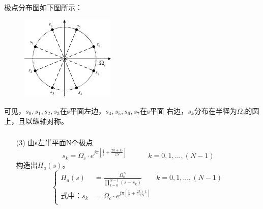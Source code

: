\documentclass[notheorems,compress,mathserif,table]{beamer}
\begin{document}
\begin{frame}\frametitle{}%
      极点分布图如下图所示：
      \begin{figure}[h]
          \centering
          \includegraphics[width=0.4\textwidth]{fig8_example.jpg}
      \end{figure}

      可见，$s_{0},s_{1},s_{2},s_{3}$在s平面左边，$s_{4},s_{5},s_{6},s_{7}$在s平面
      右边，$s_{k}$分布在半径为$\Omega_{c}$的圆上，且以纵轴对称。
\end{frame}


\begin{frame}\frametitle{}%
\begin{enumerate}
\item [(3)]
      由s左半平面N个极点
      $$s_{k}=\Omega_{c}\cdot e^{j\pi[\frac{1}{2}+\frac{2k+1)}{2N}]}\quad\quad\quad k=0,1,...,(N-1)$$
      构造出$H_{a}(s)$。
      $$
        \left\{ \begin{aligned}
            H_{a}(s) &= \frac{\Omega_{c}^{N}}{\prod^{N-1}_{k=0}(s-s_{k})}\quad\quad k=0,1,...,(N-1)\\
          \mbox{式中：}  s_{k}    &= \Omega_{c}\cdot e^{j\pi[\frac{1}{2}+\frac{2k+1}{2N}]}\\
        \end{aligned} \right.
      $$
\end{enumerate}
\end{frame}
\end{document}
